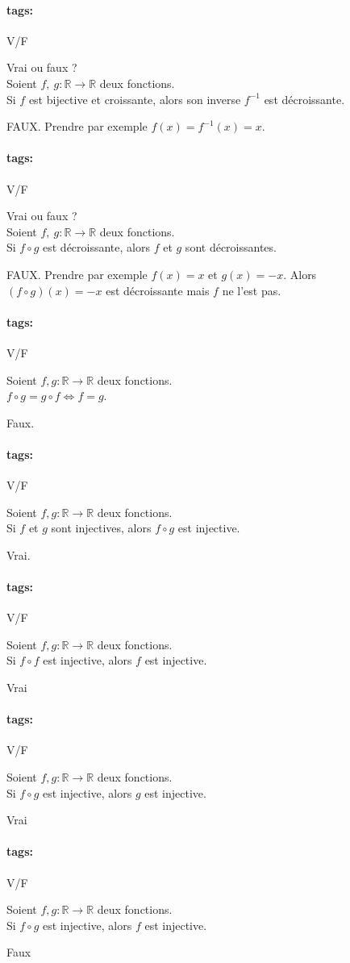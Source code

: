 \documentclass[12pt]{article}
\newcommand*{\xfield}[1]{\begin{mdframed}\centering #1\end{mdframed}\bigskip}
\newenvironment{note}{}{}
\newcommand*{\tags}[1]{\paragraph{tags: }#1}
\begin{document}
\begin{note}
\tags{V/F}
	\xfield{Vrai ou faux ?\\
	Soient $f,\ g : \mathbb{R} \to \mathbb{R}$ deux fonctions.\\
	Si $f$ est bijective et croissante, alors son inverse $f^{-1}$ est décroissante.}
	\xfield{FAUX.
Prendre par exemple $f(x) = f^{-1} (x) = x$.}
\end{note}

\begin{note}
\tags{V/F}
	\xfield{Vrai ou faux ?\\
	Soient $f,\ g : \mathbb{R} \to \mathbb{R}$ deux fonctions.\\
	Si $f\circ g$ est décroissante, alors $f$ et $g$ sont décroissantes.}
	\xfield{FAUX.
Prendre par exemple $f(x) = x$ et $g(x) = -x$. Alors $(f\circ g)(x) = -x$ est décroissante
mais $f$ ne l’est pas.}
\end{note}




\begin{note}
\tags{V/F}
	\xfield{Soient $f, g : \mathbb{R} \to \mathbb{R}$ deux fonctions.\\
	$f \circ g = g \circ f \Leftrightarrow f = g$.}
	\xfield{Faux.}
\end{note}

\begin{note}
\tags{V/F}
	\xfield{Soient $f, g : \mathbb{R} \to \mathbb{R}$ deux fonctions.\\
	Si $f$ et $g$ sont injectives, alors $f \circ g$ est injective.}
	\xfield{Vrai.}
\end{note}

\begin{note}
\tags{V/F}
	\xfield{Soient $f, g : \mathbb{R} \to \mathbb{R}$ deux fonctions.\\
	Si $f \circ f$ est injective, alors $f$ est injective.}
	\xfield{Vrai}
\end{note}

\begin{note}
\tags{V/F}
	\xfield{Soient $f, g : \mathbb{R} \to \mathbb{R}$ deux fonctions.\\
	Si $f \circ g$ est injective, alors $g$ est injective.}
	\xfield{Vrai}
\end{note}

\begin{note}
\tags{V/F}
	\xfield{Soient $f, g : \mathbb{R} \to \mathbb{R}$ deux fonctions.\\
	Si $f \circ g$ est injective, alors $f$ est injective.}
	\xfield{Faux}
\end{note}
\end{document}
